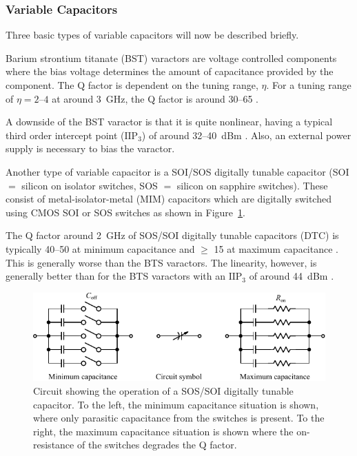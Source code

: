 \subsubsection{Variable Capacitors}
Three basic types of variable capacitors will now be described briefly. 

Barium strontium titanate (BST) varactors are voltage controlled components where the bias voltage determines the amount of capacitance provided by the component. The Q factor is dependent on the tuning range, $\eta$. For a tuning range of $\eta = 2$--$4$ at around \SI{3}{GHz}, the Q factor is around 30--65 \cite{gu2014rf}. 

A downside of the BST varactor is that it is quite nonlinear, having a typical third order intercept point ($\text{IIP}_3$) of around 32--\SI{40}{dBm} \cite{gu2014rf}. Also, an external power supply is necessary to bias the varactor.

Another type of variable capacitor is a SOI/SOS digitally tunable capacitor (SOI $=$ silicon on isolator switches, SOS $=$ silicon on sapphire switches). These consist of metal-isolator-metal (MIM) capacitors which are digitally switched using CMOS SOI or SOS switches as shown in Figure~\ref{fig:sossoiswitch}. 

The Q factor around \SI{2}{GHz} of SOS/SOI digitally tunable capacitors (DTC) is typically 40--50 at minimum capacitance and $\geq$ 15 at maximum capacitance \cite{gu2014rf}. This is generally worse than the BTS varactors. The linearity, however, is generally better than for the BTS varactors with an $\text{IIP}_3$ of around \SI{44}{dBm} \cite{gu2014rf}.

\begin{figure}[htbp]
    \centering
    \includegraphics{img/analysis/sossoi_dtc}
    \caption{Circuit showing the operation of a SOS/SOI digitally tunable capacitor. To the left, the minimum capacitance situation is shown, where only parasitic capacitance from the switches is present. To the right, the maximum capacitance situation is shown where the on-resistance of the switches degrades the Q factor.}
    \label{fig:sossoiswitch}
\end{figure}

